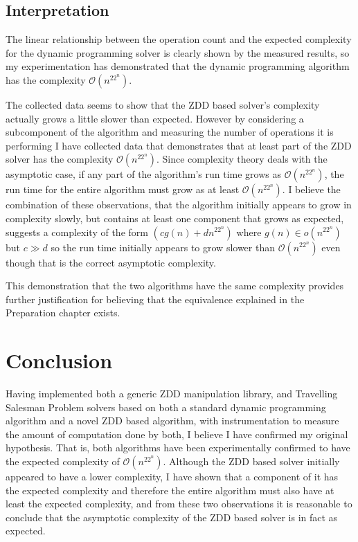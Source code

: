 \documentclass[12pt,a4paper,twoside,openright]{report}
\begin{document}
\section{Interpretation}
The linear relationship between the operation count and the expected complexity for the dynamic programming solver is clearly shown by the measured results, so my experimentation has demonstrated that the dynamic programming algorithm has the complexity $\mathcal{O}(n^22^n)$.

The collected data seems to show that the ZDD based solver's complexity actually grows a little slower than expected. However by considering a subcomponent of the algorithm and measuring the number of operations it is performing I have collected data that demonstrates that at least part of the ZDD solver has the complexity $\mathcal{O}(n^22^n)$. Since complexity theory deals with the asymptotic case, if any part of the algorithm's run time grows as $\mathcal{O}(n^22^n)$, the run time for the entire algorithm must grow as at least $\mathcal{O}(n^22^n)$. I believe the combination of these observations, that the algorithm initially appears to grow in complexity slowly, but contains at least one component that grows as expected, suggests a complexity of the form $(cg(n) + dn^22^n)$ where $g(n)\in o(n^22^n)$ but $c \gg d$ so the run time initially appears to grow slower than $\mathcal{O}(n^22^n)$ even though that is the correct asymptotic complexity.

This demonstration that the two algorithms have the same complexity provides further justification for believing that the equivalence explained in the Preparation chapter exists.

\chapter{Conclusion}
Having implemented both a generic ZDD manipulation library, and Travelling Salesman Problem solvers based on both a standard dynamic programming algorithm and a novel ZDD based algorithm, with instrumentation to measure the amount of computation done by both, I believe I have confirmed my original hypothesis. That is, both algorithms have been experimentally confirmed to have the expected complexity of $\mathcal{O}(n^22^n)$. Although the ZDD based solver initially appeared to have a lower complexity, I have shown that a component of it has the expected complexity and therefore the entire algorithm must also have at least the expected complexity, and from these two observations it is reasonable to conclude that the asymptotic complexity of the ZDD based solver is in fact as expected.
\end{document}
